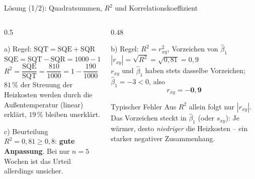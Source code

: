 \documentclass[aspectratio=169,11pt]{beamer}
\begin{document}
\begin{frame}{Lösung (1/2): Quadratsummen, $R^{2}$ und Korrelationskoeffizient}
  \begin{columns}[T]
    \begin{column}{0.5\textwidth}
      \small
      \begin{block}{a) Regel: $\text{SQT} = \text{SQE} + \text{SQR}$}
        $\text{SQE} = \text{SQT} - \text{SQR} = 1000 - 190 = \mathbf{810}$\\[3pt]
        $R^{2} = \dfrac{\text{SQE}}{\text{SQT}} = \dfrac{810}{1000} = 1 - \dfrac{190}{1000} = \mathbf{0{,}81}$\\[3pt]
        $81\,\%$ der Streuung der Heizkosten werden durch die Außentemperatur
        (linear) erklärt, $19\,\%$ bleiben unerklärt.
      \end{block}
      \begin{exampleblock}{c) Beurteilung}
        $R^{2} = 0{,}81 \ge 0{,}8$: \textbf{gute Anpassung}. Bei nur $n = 5$
        Wochen ist das Urteil allerdings unsicher.
      \end{exampleblock}
    \end{column}
    \begin{column}{0.48\textwidth}
      \small
      \begin{block}{b) Regel: $R^{2} = r_{xy}^{2}$, Vorzeichen von $\hat{\beta}_1$}
        $|r_{xy}| = \sqrt{R^{2}} = \sqrt{0{,}81} = 0{,}9$\\[3pt]
        $r_{xy}$ und $\hat{\beta}_1$ haben stets dasselbe Vorzeichen;
        $\hat{\beta}_1 = -3 < 0$, also
        \[ r_{xy} = \mathbf{-0{,}9} \]
        \vspace{-10pt}
      \end{block}
      \begin{alertblock}{Typischer Fehler}
        Aus $R^{2}$ allein folgt nur $|r_{xy}|$. Das Vorzeichen steckt in
        $\hat{\beta}_1$ (oder $s_{xy}$): Je wärmer, desto \emph{niedriger} die
        Heizkosten -- ein starker negativer Zusammenhang.
      \end{alertblock}
    \end{column}
  \end{columns}
\end{frame}
\end{document}
